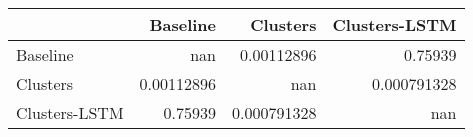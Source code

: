\begin{tabular}{lrrr}
\toprule
               &     Baseline &      Clusters &   Clusters-LSTM \\
\midrule
 Baseline      & nan          &   0.00112896  &     0.75939     \\
 Clusters      &   0.00112896 & nan           &     0.000791328 \\
 Clusters-LSTM &   0.75939    &   0.000791328 &   nan           \\
\bottomrule
\end{tabular}